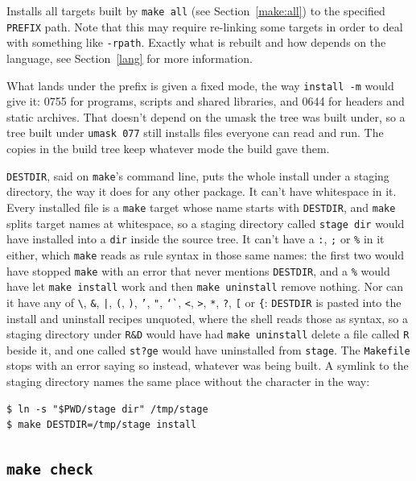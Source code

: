 \documentclass{article}
\begin{document}
Installs all targets built by \texttt{make all} (see
Section~\ref{make:all}) to the specified \texttt{PREFIX} path.  Note
that this may require re-linking some targets in order to deal with
something like \texttt{-rpath}.  Exactly what is rebuilt and how
depends on the language, see Section~\ref{lang} for more information.

What lands under the prefix is given a fixed mode, the way
\texttt{install -m} would give it: 0755 for programs, scripts and
shared libraries, and 0644 for headers and static archives.  That
doesn't depend on the umask the tree was built under, so a tree built
under \texttt{umask 077} still installs files everyone can read and
run.  The copies in the build tree keep whatever mode the build gave
them.

\texttt{DESTDIR}, said on \texttt{make}'s command line, puts the whole
install under a staging directory, the way it does for any other
package.  It can't have whitespace in it.  Every installed file is a
\texttt{make} target whose name starts with \texttt{DESTDIR}, and
\texttt{make} splits target names at whitespace, so a staging
directory called \texttt{stage dir} would have installed into a
\texttt{dir} inside the source tree.  It can't have a \texttt{:},
\texttt{;} or \texttt{\%} in it either, which \texttt{make} reads as
rule syntax in those same names: the first two would have stopped
\texttt{make} with an error that never mentions \texttt{DESTDIR},
and a \texttt{\%} would have let
\texttt{make install} work and then \texttt{make uninstall} remove
nothing.  Nor can it have any of \texttt{\textbackslash}, \texttt{\&},
\texttt{|}, \texttt{(}, \texttt{)}, \texttt{'}, \texttt{"},
\texttt{\char`\`}, \texttt{<}, \texttt{>}, \texttt{*}, \texttt{?},
\texttt{[} or \texttt{\{}: \texttt{DESTDIR} is pasted into the install
and uninstall recipes unquoted, where the shell reads those as syntax,
so a staging directory under \texttt{R\&D} would have had
\texttt{make uninstall} delete a file called \texttt{R} beside it, and
one called \texttt{st?ge} would have uninstalled from \texttt{stage}.
The \texttt{Makefile} stops with an error saying so instead,
whatever was being built.  A symlink to the staging directory names
the same place without the character in the way:

\begin{verbatim}
$ ln -s "$PWD/stage dir" /tmp/stage
$ make DESTDIR=/tmp/stage install
\end{verbatim}

\subsection{\texttt{make check} \label{make:check}}
\end{document}
